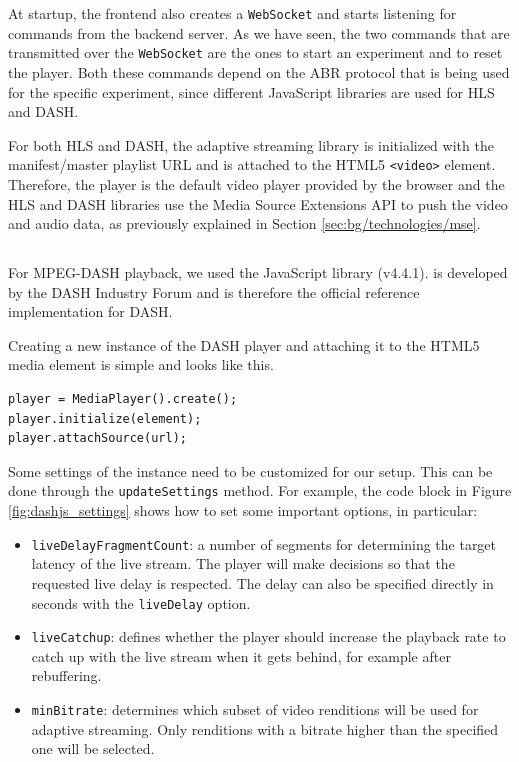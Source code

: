At startup, the frontend also creates a \texttt{WebSocket} and starts listening for commands from the backend server. As we have seen, the two commands that are transmitted over the \texttt{WebSocket} are the ones to start an experiment and to reset the player. Both these commands depend on the ABR protocol that is being used for the specific experiment, since different JavaScript libraries are used for HLS and DASH.

For both HLS and DASH, the adaptive streaming library is initialized with the manifest/master playlist URL and is attached to the HTML5 \texttt{<video>} element. Therefore, the player is the default video player provided by the browser and the HLS and DASH libraries use the Media Source Extensions API to push the video and audio data, as previously explained in Section \ref{sec:bg/technologies/mse}.

\subsection{\dashjs{}}
\label{sec:testbed/frontend/dashjs}

For MPEG-DASH playback, we used the \dashjs{} JavaScript library (v4.4.1). \dashjs{} is developed by the DASH Industry Forum and is therefore the official reference implementation for DASH.

Creating a new instance of the DASH player and attaching it to the HTML5 media element is simple and looks like this.

\begin{verbatim}
player = MediaPlayer().create();
player.initialize(element);
player.attachSource(url);
\end{verbatim}

Some settings of the \dashjs{} instance need to be customized for our setup. This can be done through the \texttt{updateSettings} method. For example, the code block in Figure \ref{fig:dashjs_settings} shows how to set some important options, in particular:

\begin{itemize}
    \item \texttt{liveDelayFragmentCount}: a number of segments for determining the target latency of the live stream. The player will make decisions so that the requested live delay is respected. The delay can also be specified directly in seconds with the \texttt{liveDelay} option.
    \item \texttt{liveCatchup}: defines whether the player should increase the playback rate to catch up with the live stream when it gets behind, for example after rebuffering.
    \item \texttt{minBitrate}: determines which subset of video renditions will be used for adaptive streaming. Only renditions with a bitrate higher than the specified one will be selected.
\end{itemize}

